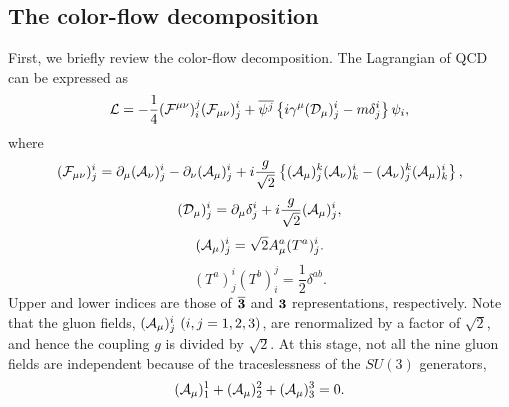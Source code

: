 \documentclass[a4paper,11pt]{article}
\begin{document}
\subsection{The color-flow decomposition}
First, we briefly review the color-flow decomposition. The Lagrangian of
QCD can be expressed as
\begin{equation}
 {\cal L}=-\frac{1}{4}({\cal F}^{\mu\nu})^j_i({\cal F}_{\mu\nu})^i_j
+\overline{\psi^j}\left\{i\gamma^{\mu}({\cal D}_{\mu})^i_j
-m\delta^i_j\right\}\psi_i,\label{lagrangian}
\end{equation}
where
\begin{equation}
 ({\cal F}_{\mu\nu})^i_j=\partial_{\mu}({\cal A}_{\nu})^i_j
-\partial_{\nu}({\cal A}_{\mu})^i_j+i\frac{g}{\sqrt{2}}\left\{({\cal A}_{\mu})^k_j
({\cal A}_{\nu})^i_k-({\cal A}_{\nu})^k_j
({\cal A}_{\mu})^i_k\right\},
  \end{equation}
\begin{equation}
 ({\cal
  D}_{\mu})^i_j=\partial_{\mu}\delta^i_j+i\frac{g}{\sqrt{2}}({\cal
  A}_{\mu})^i_j,
\end{equation}
\begin{equation}
 ({\cal A}_{\mu})^i_j=\sqrt{2}A_{\mu}^a(T^a)^i_j.
\end{equation}
\begin{equation}
 (T^a)^i_j(T^b)^j_i = \frac{1}{2}\delta^{ab}.
\end{equation}
Upper and lower indices are those of ${\bf \overline{3}}$ and ${\bf 3}$
representations, respectively. Note that the gluon fields, $({\cal
A}_{\mu})^i_j\,\,(i,j=1, 2, 3)$, are renormalized by a
factor of $\sqrt{2}$, and hence the coupling $g$ is divided by
$\sqrt{2}$. At this stage, not all the nine gluon fields are independent
because of  the traceslessness of the $SU(3)$ generators,
\begin{equation}
({\cal A}_{\mu})^1_1 + ({\cal A}_{\mu})^2_2 + ({\cal A}_{\mu})^3_3 = 0.
\end{equation}
\end{document}
